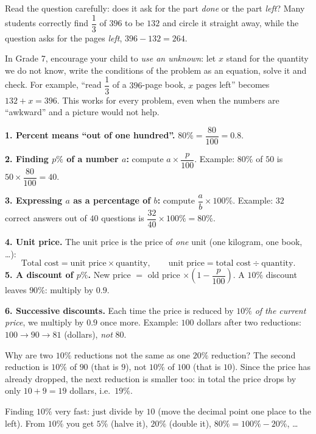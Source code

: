 \begin{warnbox}
Read the question carefully: does it ask for the part \emph{done} or the part \emph{left}? Many students correctly find
$\dfrac13$ of $396$ to be $132$ and circle it straight away, while the question asks for the pages \emph{left},
$396 - 132 = 264$.
\end{warnbox}
\begin{parentbox}
In Grade 7, encourage your child to \emph{use an unknown}: let $x$ stand for the quantity we do not know, write the
conditions of the problem as an equation, solve it and check. For example, ``read $\dfrac13$ of a $396$-page book, $x$
pages left'' becomes $132 + x = 396$. This works for every problem, even when the numbers are ``awkward'' and a picture
would not help.
\end{parentbox}

\begin{knowbox}
\textbf{1. Percent means ``out of one hundred''.} $80\% = \dfrac{80}{100} = 0.8$.

\textbf{2. Finding $p\%$ of a number $a$:} compute $a \times \dfrac{p}{100}$. Example: $80\%$ of $50$ is
$50 \times \dfrac{80}{100} = 40$.

\textbf{3. Expressing $a$ as a percentage of $b$:} compute $\dfrac{a}{b}\times 100\%$. Example: $32$ correct answers out of
$40$ questions is $\dfrac{32}{40}\times 100\% = 80\%$.

\textbf{4. Unit price.} The unit price is the price of \emph{one} unit (one kilogram, one book, \ldots):
\[ \text{Total cost} = \text{unit price} \times \text{quantity}, \qquad \text{unit price} = \text{total cost} \div \text{quantity}. \]
\textbf{5. A discount of $p\%$.} New price $=$ old price $\times \left(1 - \dfrac{p}{100}\right)$. A $10\%$ discount
leaves $90\%$: multiply by $0.9$.

\textbf{6. Successive discounts.} Each time the price is reduced by $10\%$ \emph{of the current price}, we multiply by
$0.9$ once more. Example: $100$ dollars after two reductions: $100 \to 90 \to 81$ (dollars), \emph{not} $80$.
\end{knowbox}
\begin{proofbox}
Why are two $10\%$ reductions not the same as one $20\%$ reduction? The second reduction is $10\%$ of $90$ (that is $9$),
not $10\%$ of $100$ (that is $10$). Since the price has already dropped, the next reduction is smaller too: in total the
price drops by only $10 + 9 = 19$ dollars, i.e.\ $19\%$.
\end{proofbox}
\begin{tipbox}
Finding $10\%$ very fast: just divide by $10$ (move the decimal point one place to the left). From $10\%$ you get
$5\%$ (halve it), $20\%$ (double it), $80\% = 100\% - 20\%$, \ldots
\end{tipbox}

